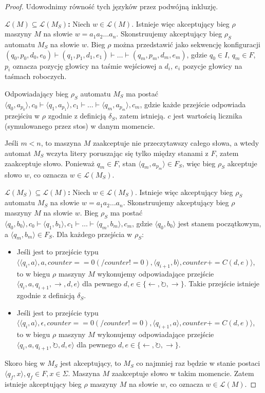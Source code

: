\documentclass{article}
\theoremstyle{definition}
\theoremstyle{remark}
\begin{document}
\begin{proof}
Udowodnimy równość tych języków przez podwójną inkluzję.

\medskip
\noindent\textbf{$\mathcal{L}(M) \subseteq \mathcal{L}(M_S)$:}
Niech $w \in \mathcal{L}(M)$. Istnieje więc akceptujący bieg $\rho$ maszyny $M$ na słowie $w = a_1a_2\ldots a_n$.
Skonstruujemy akceptujący bieg $\rho_S$ automatu $M_S$ na słowie $w$.
Bieg $\rho$ można przedstawić jako sekwencję konfiguracji $(q_0, p_0, d_0, e_0) \vdash (q_1, p_1, d_1, e_1) \vdash \ldots \vdash (q_m, p_m, d_m, e_m)$, gdzie $q_0 \in I$, $q_m \in F$, $p_i$ 
oznacza pozycję głowicy na taśmie wejściowej a $d_i$, $e_i$ pozycje głowicy na taśmach roboczych.

Odpowiadający bieg $\rho_S$ automatu $M_S$ ma postać $\langle q_0, a_{p_0} \rangle, c_0 \vdash \langle q_1, a_{p_1} \rangle, c_1 \vdash \ldots \vdash \langle q_m, a_{p_m} \rangle, c_m$, gdzie każde przejście odpowiada przejściu w $\rho$ zgodnie z definicją $\delta_S$, zatem istnieją.
$c$ jest wartością licznika (symulowanego przez stos) w danym momencie.

Jeśli $ m < n$, to maszyna $M$ zaakceptuje nie przeczytawszy całego słowa, a wtedy automat $M_S$ wczyta litery poruszając się tylko między stanami z \(F\), zatem zaakceptuje słowo.
Ponieważ $q_m \in F$, stan $\langle q_m, a_{p_m} \rangle \in F_S$, więc bieg $\rho_S$ akceptuje słowo $w$, co oznacza $w \in \mathcal{L}(M_S)$.

\medskip
\noindent\textbf{$\mathcal{L}(M_S) \subseteq \mathcal{L}(M)$:}
Niech $w \in \mathcal{L}(M_S)$. Istnieje więc akceptujący bieg $\rho_S$ automatu $M_S$ na słowie $w = a_1a_2\ldots a_n$.
Skonstruujemy akceptujący bieg $\rho$ maszyny $M$ na słowie $w$.
Bieg $\rho_S$ ma postać $\langle q_0, b_0 \rangle, c_0 \vdash \langle q_1, b_1 \rangle, c_1 \vdash \ldots \vdash \langle q_m, b_m \rangle, c_m$, gdzie $\langle q_0, b_0 \rangle$ jest stanem początkowym, a $\langle q_m, b_m \rangle \in F_S$.
Dla każdego przejścia w $\rho_S$:
\begin{itemize}
    \item Jeśli jest to przejście typu $\langle \langle q_i, a \rangle, a, counter==0 (/ counter!=0), \langle q_{i+1}, b \rangle, counter+=C(d,e) \rangle$, to w biegu $\rho$ maszyny $M$ wykonujemy odpowiadające przejście $\langle q_i, a, q_{i+1}, \rightarrow, d, e \rangle$ dla pewnego $d, e \in \{\leftarrow, \circlearrowright, \rightarrow\}$.
    Takie przejście istnieje zgodnie z definicją $\delta_S$.
    
    \item Jeśli jest to przejście typu $\langle \langle q_i, a \rangle, \epsilon, counter==0 (/ counter!=0), \langle q_{i+1}, a \rangle, counter+=C(d,e) \rangle$, to w biegu $\rho$ maszyny $M$ wykonujemy odpowiadające przejście $\langle q_i, a, q_{i+1}, \circlearrowright, d, e \rangle$ dla pewnego $d, e \in \{\leftarrow, \circlearrowright, \rightarrow\}$.
\end{itemize}
Skoro bieg w \(M_S\) jest akceptujący, to \(M_S\) co najmniej raz będzie w stanie postaci \(\langle q_f, x \rangle, q_f \in F, x \in \Sigma\). Maszyna \(M\) zaakceptuje słowo w takim momencie.
Zatem istnieje akceptujący bieg $\rho$ maszyny $M$ na słowie $w$, co oznacza $w \in \mathcal{L}(M)$.


\end{proof}
\end{document}
